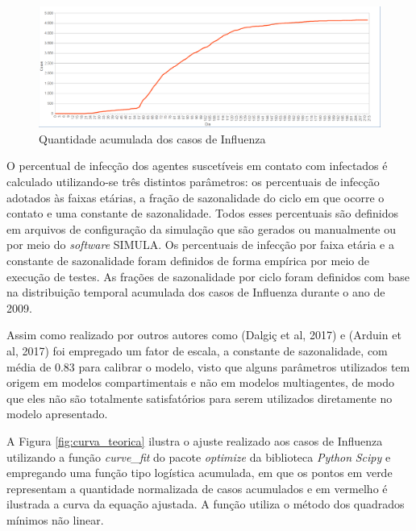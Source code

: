 \begin{figure}[H]
  \centering
  \includegraphics[width=1\textwidth]{Figuras/Observacoes/CasosAcumulados.png}
  \caption{Quantidade acumulada dos casos de Influenza}
  \label{fig:casos_acumulados}
\end{figure} 

O percentual de infecção dos agentes suscetíveis em contato com infectados é calculado utilizando-se três distintos parâmetros: os percentuais de infecção adotados às faixas etárias, a fração de sazonalidade do ciclo em que ocorre o contato e uma constante de sazonalidade. Todos esses percentuais são definidos em arquivos de configuração da simulação que são gerados ou manualmente ou por meio do \textit{software} SIMULA. Os percentuais de infecção por faixa etária e a constante de sazonalidade foram definidos de forma empírica por meio de execução de testes. As frações de sazonalidade por ciclo foram definidos com base na distribuição temporal acumulada dos casos de Influenza durante o ano de 2009. 

Assim como realizado por outros autores como (Dalgiç et al, 2017) e (Arduin et al, 2017) foi empregado um fator de escala, a constante de sazonalidade, com média de $0.83$ para calibrar o modelo, visto que alguns parâmetros utilizados tem origem em modelos compartimentais e não em modelos multiagentes, de modo que eles não são totalmente satisfatórios para serem utilizados diretamente no modelo apresentado.

A Figura \ref{fig:curva_teorica} ilustra o ajuste realizado aos casos de Influenza utilizando a função \textit{curve\_fit} do pacote \textit{optimize} da biblioteca \textit{Python} \textit{Scipy} e empregando uma função tipo logística acumulada, em que os pontos em verde representam a quantidade normalizada de casos acumulados e em vermelho é ilustrada a curva da equação ajustada. A função utiliza o método dos quadrados mínimos não linear.

